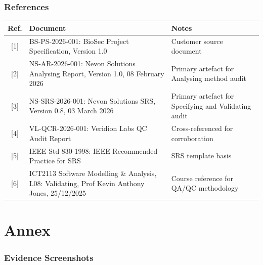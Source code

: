 \documentclass[11pt,a4paper]{article}
\begin{document}
\clearpage
\renewcommand{\appendixprefix}{F}
\setcounter{page}{1}
\section{References}

\begin{longtable}{|c|L{7.5cm}|L{4.5cm}|}
\hline
{}
\textbf{Ref.} & \textbf{Document} & \textbf{Notes} \\
\hline
\endhead
{[1]} & BS-PS-2026-001: BioSec Project Specification, Version 1.0 & Customer source document \\\hline
{[2]} & NS-AR-2026-001: Nevon Solutions Analysing Report, Version 1.0, 08 February 2026 & Primary artefact for Analysing method audit \\\hline
{[3]} & NS-SRS-2026-001: Nevon Solutions SRS, Version 0.8, 03 March 2026 & Primary artefact for Specifying and Validating audit \\\hline
{[4]} & VL-QCR-2026-001: Veridion Labs QC Audit Report & Cross-referenced for corroboration \\\hline
{[5]} & IEEE Std 830-1998: IEEE Recommended Practice for SRS & SRS template basis \\\hline
{[6]} & ICT2113 Software Modelling \& Analysis, L08: Validating, Prof Kevin Anthony Jones, 25/12/2025 & Course reference for QA/QC methodology \\\hline
\end{longtable}


\clearpage

\renewcommand{\thepage}{\roman{page}}
\setcounter{page}{1}

\part*{Annex}
{}

\setcounter{section}{0}

\section{Evidence Screenshots}
\label{annex:evidence}
\end{document}
